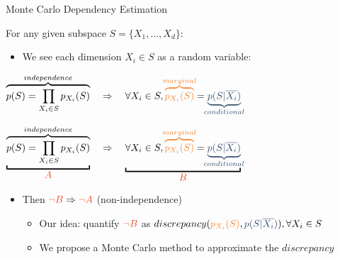 \documentclass[16pt,usenames,dvipsnames, notheorems]{beamer}
\theoremstyle{definition}
\theoremstyle{example}
\theoremstyle{plain}
\begin{document}
\begin{frame}{Monte Carlo Dependency Estimation}

For any given subspace $S = \{X_1, \dots, X_d\}$:

\begin{itemize}
	\item We see each dimension $X_i \in S$ as a random variable:  
\end{itemize}
\pause

\begin{overprint}
	\begin{center}
		$\overbrace{p(S) = \prod_{X_{i} \in S} p_{X_i}(S)}^{\mathclap{independence}} 
		\quad \Rightarrow \quad \forall X_i \in S,   \textcolor{specialorange}{\overbrace{p_{X_i}(S)}^{\mathclap{marginal}}} = \textcolor{specialblue}{{\underbrace{p(S|\overline{X_i})}_{\mathclap{conditional}}}}$
	\end{center}
	\begin{center}
	$ \underbracket{\overbrace{p(S) = \prod_{X_{i} \in S} p_{X_i}(S)}^{\mathclap{independence}}}_{\textcolor{uiucred}{\mathlarger{A}}} \quad \Rightarrow \quad \underbracket{\forall X_i \in S,   \textcolor{specialorange}{\overbrace{p_{X_i}(S)}^{\mathclap{marginal}}} = \textcolor{specialblue}{{\underbrace{p(S|\overline{X_i})}_{\mathclap{conditional}}}}}_{\textcolor{uiucred}{\mathlarger{B}}}
	$
	\end{center}
\end{overprint}
\pause
\pause
\begin{itemize}
	\item Then $\textcolor{uiucred}{\neg B} \Rightarrow \textcolor{uiucred}{\neg A}$ (non-independence)
\pause
\begin{itemize}
	\item Our idea: quantify $\textcolor{uiucred}{\neg B}$ as $discrepancy(\textcolor{specialorange}{p_{X_i}(S)}, \textcolor{specialblue}{{p(S|\overline{X_i})}}), \forall X_{i} \in S$
\end{itemize}
\pause
\begin{itemize}
\item We propose a Monte Carlo method to approximate the $discrepancy$
\end{itemize}
\end{itemize}
\end{frame}
\end{document}
